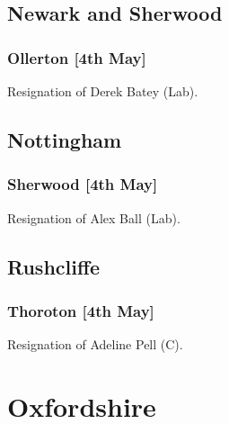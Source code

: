 \documentclass[a4paper,openany]{book}
\begin{document}
\begin{resultsiii}
\subsection*{Newark and Sherwood}

\subsubsection*{Ollerton \hspace*{\fill}\nolinebreak[1]%
\enspace\hspace*{\fill}
[4th May]}


Resignation of Derek Batey (Lab).

\subsection*{Nottingham}

\subsubsection*{Sherwood \hspace*{\fill}\nolinebreak[1]%
\enspace\hspace*{\fill}
[4th May]}


Resignation of Alex Ball (Lab).

\subsection*{Rushcliffe}

\subsubsection*{Thoroton \hspace*{\fill}\nolinebreak[1]%
\enspace\hspace*{\fill}
[4th May]}


Resignation of Adeline Pell (C).

\section{Oxfordshire}


\end{resultsiii}
\end{document}
